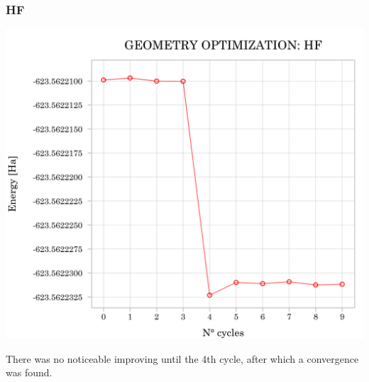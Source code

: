 \documentclass{article}
\begin{document}
\subsubsection{HF}
\begin{minipage}[t]{0.55\textwidth}
	\vspace{-\topskip}
	\includegraphics[width=1\textwidth]{../images/HF.png}
	\label{fig:opt_HF}
\end{minipage}
\hfill
\begin{minipage}[t]{0.4\textwidth}
	\vspace{-\topskip}
	\vspace{20pt}
	There was no noticeable improving until the 4th cycle, after which a convergence was found.
\end{minipage}
\end{document}
